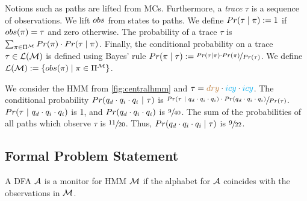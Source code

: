 \documentclass[runningheads]{llncs}
\newcommand{\icy}{{\color{cyan} icy}\xspace}
\newcommand{\dry}{{\color{brown} dry}\xspace}
\newcommand{\defeq}{:=}
\begin{document}
%
Notions such as paths are lifted from MCs. Furthermore, a \emph{trace} $\tau$ is a sequence of observations. We lift ${obs}$ from states to paths.
We define  $\Prob(\tau\mid\pi) \defeq 1$ if ${obs}(\pi) = \tau$ and zero otherwise. The probability of a trace $\tau$ is $\sum_{\pi\in\Pi^{\mathcal{M}}} {Pr}(\pi) \cdot {Pr}(\tau\mid\pi)$.
Finally, the conditional probability on a trace $\tau\in\mathcal{L}(\mathcal{M})$ is defined using Bayes' rule
$\Prob(\pi\mid\tau) \defeq \nicefrac{\Prob(\tau\mid\pi) \cdot \Prob(\pi)}{\Prob(\tau)}$.
We define $\lang{\mc} \defeq \{ \obsf(\pi) \mid \pi \in \Pi^\mc\}$.
\begin{example}
    We consider the HMM from \cref{fig:centralhmm} and $\tau = \dry\cdot \icy\cdot \icy$. The conditional probability ${Pr}(q_d\cdot q_i\cdot q_i\ |~\tau)$ is $\sfrac{{Pr}(\tau\ |~q_d\cdot q_i\cdot q_i)\cdot {Pr}(q_d\cdot q_i\cdot q_i)}{{Pr}(\tau)}$. ${Pr}(\tau~|~q_d\cdot q_i\cdot q_i)$ is 1, and ${Pr}(q_d\cdot q_i\cdot q_i)$ is $\sfrac{9}{40}$. The sum of the probabilities of all paths which observe $\tau$ is $\sfrac{11}{20}$. Thus, ${Pr}(q_d\cdot q_i\cdot q_i\mid\tau)$ is $\sfrac{9}{22}$.
\end{example}


\subsection{Formal Problem Statement}
\begin{definition}[Monitor]
    A DFA $\mathcal{A}$ is a monitor for HMM $\mathcal{M}$ if the alphabet for $\mathcal{A}$ coincides with the observations in $\mathcal{M}$.
\end{definition}
\end{document}
